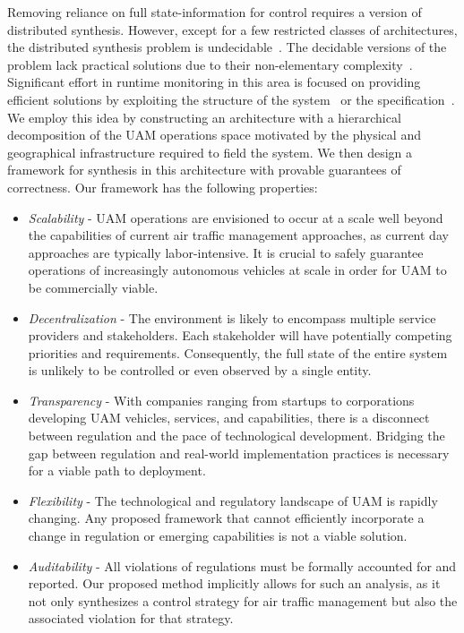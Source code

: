 Removing reliance on full state-information for control requires a version of distributed synthesis. However, except for a few restricted classes of architectures, the distributed synthesis problem is undecidable~\cite{SCHEWE2014203}. The decidable versions of the problem lack practical solutions due to their non-elementary complexity~\cite{Schewe08}. Significant effort in runtime monitoring in this area is focused on providing efficient solutions by exploiting  the structure of the system~\cite{FalconeJNBB15,CassarF16} or the specification~\cite{FrancalanzaS15,BauerF16}.  We employ this idea by constructing an architecture with a hierarchical decomposition of the UAM operations space motivated by the physical and geographical infrastructure required to field the system. We then design a framework for synthesis in this architecture with provable guarantees of correctness. Our framework has the following properties:


\begin{itemize}
	\item \emph{Scalability} - UAM operations are envisioned to occur at a scale well beyond the capabilities of current air traffic management approaches, as current day approaches are typically labor-intensive. It is crucial to safely guarantee operations of increasingly autonomous vehicles at scale in order for UAM to be commercially viable. 
	
	\item \emph{Decentralization} - The environment is likely to encompass multiple service providers and stakeholders. Each stakeholder will have potentially competing priorities and requirements. Consequently, the full state of the entire system is unlikely to be controlled or even observed by a single entity.
	
	\item \emph{Transparency} - With companies ranging from startups to corporations developing UAM vehicles, services, and capabilities, there is a disconnect between regulation and the pace of technological development. Bridging the gap between regulation and real-world implementation practices is necessary for a viable path to deployment. 
	
	\item \emph{Flexibility} - The technological and regulatory landscape of UAM is rapidly changing. Any proposed framework that cannot efficiently incorporate a change in regulation or emerging capabilities is not a viable solution. 
	
	\item \emph{Auditability} - All violations of regulations must be formally accounted for and reported. Our proposed method implicitly allows for such an analysis, as it not only synthesizes a control strategy for air traffic management but also the associated violation for that strategy. 
\end{itemize}

